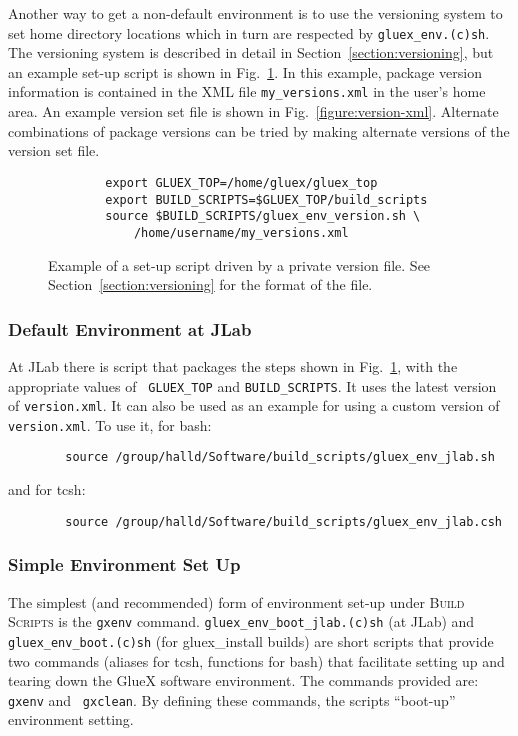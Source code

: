 \documentclass[12pt]{article}
\newcommand{\bs}{\textsc{Build Scripts}}
\newcommand{\gxenv}{{\tt gxenv}}
\begin{document}
Another way to get a non-default environment is to use the versioning
system to set home directory locations which in turn are respected by
{\tt gluex\_env.(c)sh}. The versioning system is described in detail
in Section~\ref{section:versioning}, but an example set-up script is
shown in Fig.~\ref{figure:version-script}. In this example, package version
information is contained in the XML file {\tt my\_versions.xml} in the
user's home area. An example version set file is shown in Fig.~\ref{figure:version-xml}. Alternate combinations of package versions can be tried by making alternate versions of the version set file.

\begin{figure}
\begin{verbatim}
        export GLUEX_TOP=/home/gluex/gluex_top
        export BUILD_SCRIPTS=$GLUEX_TOP/build_scripts
        source $BUILD_SCRIPTS/gluex_env_version.sh \
            /home/username/my_versions.xml
\end{verbatim}
\caption{Example of a set-up script driven by a private version
  file. See Section~\ref{section:versioning} for the format of the
  file.}\label{figure:version-script}
\end{figure}

\subsubsection{Default Environment at JLab}

At JLab there is script that packages the steps shown in
Fig.~\ref{figure:version-script}, with the appropriate values of {\tt
  GLUEX\_TOP} and {\tt BUILD\_SCRIPTS}. It uses the latest version of
{\tt version.xml}. It can also be used as an example for using a
custom version of {\tt version.xml}. To use it, for bash:
\begin{verbatim}
        source /group/halld/Software/build_scripts/gluex_env_jlab.sh
\end{verbatim}
and for tcsh:
\begin{verbatim}
        source /group/halld/Software/build_scripts/gluex_env_jlab.csh
\end{verbatim}

\subsubsection{Simple Environment Set Up}

The simplest (and recommended) form of environment set-up under \bs{}
is the \gxenv{} command.  {\tt gluex\_env\_boot\_jlab.(c)sh} (at JLab)
and {\tt gluex\_env\_boot.(c)sh} (for gluex\_install builds) are short
scripts that provide two commands (aliases for tcsh, functions for
bash) that facilitate setting up and tearing down the GlueX software
environment. The commands provided are: {\tt gxenv} and {\tt
  gxclean}. By defining these commands, the scripts ``boot-up''
environment setting.
\end{document}
